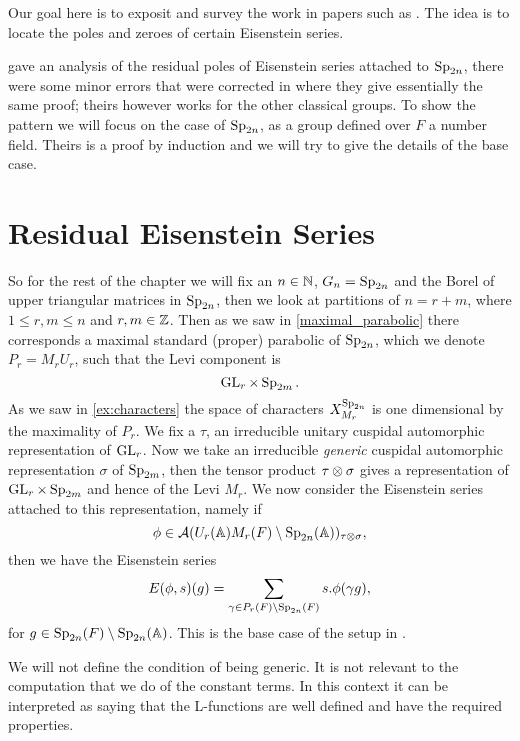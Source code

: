 \label{ch:jiang}
Our goal here is to exposit and survey the work in papers such as \cite{brennerNotesAnalyticProperties2009}\cite{jiangPolesCertainResidual2013}. The idea is to locate the poles and zeroes of certain Eisenstein series. 

\cite{brennerNotesAnalyticProperties2009} gave an analysis of the residual poles of Eisenstein series attached to \(\operatorname{Sp}_{2n}\), there were some minor errors that were corrected in \cite{jiangPolesCertainResidual2013} where they give essentially the same proof; theirs however works for the other classical groups. To show the pattern we will focus on the case of \(\operatorname{Sp}_{2n}\), as a group defined over \(F\) a number field. Theirs is a proof by induction and we will try to give the details of the base case. 

\section{Residual Eisenstein Series}
So for the rest of the chapter we will fix an \(n\in \N\), \(G_n = \operatorname{Sp}_{2n}\) and the Borel of upper triangular matrices in \(\operatorname{Sp}_{2n} \), then we look at partitions of \(n = r + m\), where \(1\leq r,m \leq n\) and \(r,m\in \Z\). Then as we saw in \ref{maximal_parabolic} there corresponds a maximal standard (proper) parabolic of \(\operatorname{Sp}_{2n}\), which we denote \(P_r = M_rU_r\), such that the Levi component is 
\[\operatorname{GL}_r\times \operatorname{Sp}_{2m}. \]
As we saw in \ref{ex:characters} the space of characters \(X^{\operatorname{Sp}_{2n}}_{M_r}\) is one dimensional by the maximality of \(P_r\). We fix a \(\tau\), an irreducible unitary cuspidal automorphic representation of \(\operatorname{GL}_r\). Now we take an irreducible \textit{generic} cuspidal automorphic representation \(\sigma\) of \(\operatorname{Sp}_{2m}\), then the tensor product \(\tau \otimes \sigma\) gives a representation of \(\operatorname{GL}_{r}\times \operatorname{Sp}_{2m}\) and hence of the Levi \(M_r\). We now consider the Eisenstein series attached to this representation, namely if 
\[\phi\in \mathcal{A}(U_r(\A)M_r(F)\setminus \Sp_{2n}(\A) )_{\tau\tensor \sigma},\] 
then we have the Eisenstein series
\[E(\phi, s)(g) = \sum_{\gamma\in P_r(F) \setminus \Sp_{2n}(F)} s.\phi(\gamma g),\]
for \(g\in \Sp_{2n}(F) \setminus \Sp_{2n}(\A)\). 
This is the base case of the setup in \cite{jiangPolesCertainResidual2013}.

\begin{remark}
	We will not define the condition of being generic. It is not relevant to the computation that we do of the constant terms. In this context it can be interpreted as saying that the L-functions are well defined and have the required properties.
\end{remark}


